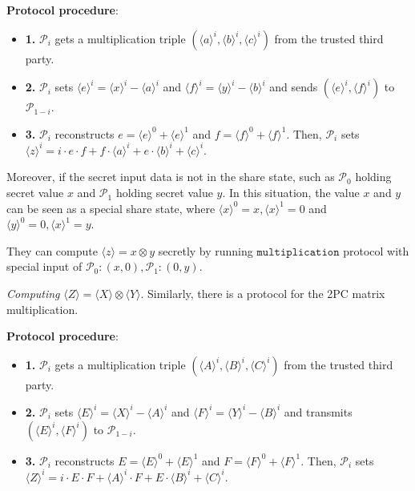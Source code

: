 \documentclass[letterpaper]{article} %
\begin{document}
    \textbf{Protocol procedure}:
    \begin{itemize}
        \item \textbf{1.} $\mathcal{P}_{i}$ gets a multiplication triple
        $(\langle a\rangle ^{i},\langle b\rangle ^{i},\langle c\rangle ^{i})$ from the trusted third party.
        \item \textbf{2.} $\mathcal{P}_{i}$ sets $\langle e\rangle ^{i}=\langle x\rangle ^{i}-\langle a\rangle ^{i}$ and $\langle f\rangle ^{i}=\langle y\rangle ^{i}-\langle b\rangle ^{i}$
        and sends $(\langle e\rangle ^{i},\langle f\rangle ^{i})$ to $\mathcal{P}_{1-i}$.
        \item \textbf{3.} $\mathcal{P}_{i}$ reconstructs $e = \langle e\rangle ^{0}+\langle e\rangle ^{1}$ and $f = \langle f\rangle ^{0}+\langle f\rangle ^{1}$.
        Then, $\mathcal{P}_{i}$ sets $\langle z\rangle^{i}=i\cdot e \cdot f + f\cdot \langle a\rangle^{i}+e \cdot \langle b\rangle^{i} + \langle c\rangle^{i}$.

    \end{itemize}


    Moreover, if the secret input data is not in the share state,
    such as $\mathcal{P}_{0}$ holding secret value $x$
    and $\mathcal{P}_{1}$ holding secret value $y$.
    In this situation, the value $x$ and $y$ can be
    seen as a special share state, where
    $\langle x\rangle ^{0}=x,\langle x\rangle ^{1}=0$ and
    $\langle y\rangle ^{0}=0,\langle x\rangle ^{1}=y$.

    They can compute $\langle z\rangle=x\otimes y$ secretly
    by running $\mathtt{multiplication}$ protocol with special input of
    $\mathcal{P}_{0}:(x,0),\mathcal{P}_{1}:(0,y)$.




    \emph{Computing} $ \langle Z\rangle  = \langle X\rangle  \otimes \langle Y\rangle$.
    Similarly, there is a protocol for the 2PC matrix multiplication.

    \textbf{Protocol procedure}:
    \begin{itemize}
        \item \textbf{1.} $\mathcal{P}_{i}$ gets a multiplication triple
        $(\langle A\rangle ^{i},\langle B\rangle ^{i},\langle C\rangle ^{i})$ from the trusted third party.
        \item \textbf{2.} $\mathcal{P}_{i}$ sets $\langle E\rangle ^{i}=\langle X\rangle ^{i}-\langle A\rangle ^{i}$ and $\langle F\rangle ^{i}=\langle Y\rangle ^{i}-\langle B\rangle ^{i}$
        and transmits $(\langle E\rangle ^{i},\langle F\rangle ^{i})$ to $\mathcal{P}_{1-i}$.
        \item \textbf{3.} $\mathcal{P}_{i}$ reconstructs $E = \langle E\rangle ^{0}+\langle E\rangle ^{1}$ and $F = \langle F\rangle ^{0}+\langle F\rangle ^{1}$.
        Then, $\mathcal{P}_{i}$ sets $\langle Z\rangle^{i}=i\cdot E \cdot F + \langle A\rangle^{i} \cdot F + E \cdot \langle B\rangle^{i} + \langle C\rangle^{i}$.

    \end{itemize}
\end{document}
